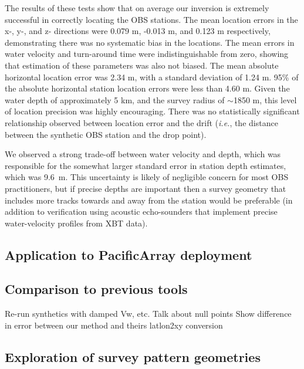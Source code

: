 The results of these tests show that on average our inversion is extremely successful in correctly locating the OBS stations. The mean location errors in the x-, y-, and z- directions were 0.079 m, -0.013 m, and 0.123 m respectively, demonstrating there was no systematic bias in the locations. The mean errors in water velocity and turn-around time were indistinguishable from zero, showing that estimation of these parameters was also not biased. The mean absolute horizontal location error was 2.34 m, with a standard deviation of 1.24 m. 95\% of the absolute horizontal station location errors were less than 4.60 m. Given the water depth of approximately 5 km, and the survey radius of $\sim$1850 m, this level of location precision was highly encouraging. There was no statistically significant relationship observed between location error and the drift (\textit{i.e.}, the distance between the synthetic OBS station and the drop point).

We observed a strong trade-off between water velocity and depth, which was responsible for the somewhat larger standard error in station depth estimates, which was \mbox{9.6 m}. This uncertainty is likely of negligible concern for most OBS practitioners, but if precise depths are important then a survey geometry that includes more tracks towards and away from the station would be preferable (in addition to verification using acoustic echo-sounders that implement precise water-velocity profiles from XBT data).

\subsection{Application to PacificArray deployment}

\subsection{Comparison to previous tools}
Re-run synthetics with damped Vw, etc.
Talk about null points
Show difference in error between our method and theirs
latlon2xy conversion


\subsection{Exploration of survey pattern geometries} \label{sec:surv_geom_tests}